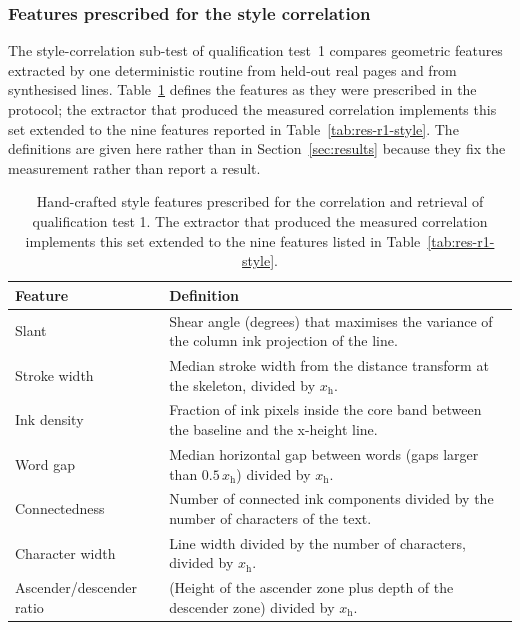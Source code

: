 \subsubsection{Features prescribed for the style correlation}

The style-correlation sub-test of qualification test~1 compares geometric features extracted by one deterministic routine from held-out real pages and from synthesised lines.
Table~\ref{tab:res-features} defines the features as they were prescribed in the protocol; the extractor that produced the measured correlation implements this set extended to the nine features reported in Table~\ref{tab:res-r1-style}.
The definitions are given here rather than in Section~\ref{sec:results} because they fix the measurement rather than report a result.

\begin{table}[h]
\centering
\fontsize{10}{12}\selectfont
\begin{tabularx}{\linewidth}{|>{\raggedright\arraybackslash}p{3.3cm}|X|}
\hline
\textbf{Feature} & \textbf{Definition} \\
\hline
Slant & Shear angle (degrees) that maximises the variance of the column ink projection of the line. \\
\hline
Stroke width & Median stroke width from the distance transform at the skeleton, divided by $x_{\mathrm{h}}$. \\
\hline
Ink density & Fraction of ink pixels inside the core band between the baseline and the x-height line. \\
\hline
Word gap & Median horizontal gap between words (gaps larger than $0.5\,x_{\mathrm{h}}$) divided by $x_{\mathrm{h}}$. \\
\hline
Connectedness & Number of connected ink components divided by the number of characters of the text. \\
\hline
Character width & Line width divided by the number of characters, divided by $x_{\mathrm{h}}$. \\
\hline
Ascender/descender ratio & (Height of the ascender zone plus depth of the descender zone) divided by $x_{\mathrm{h}}$. \\
\hline
\end{tabularx}
\caption{Hand-crafted style features prescribed for the correlation and retrieval of qualification test 1. The extractor that produced the measured correlation implements this set extended to the nine features listed in Table~\ref{tab:res-r1-style}.}
\label{tab:res-features}
\end{table}

